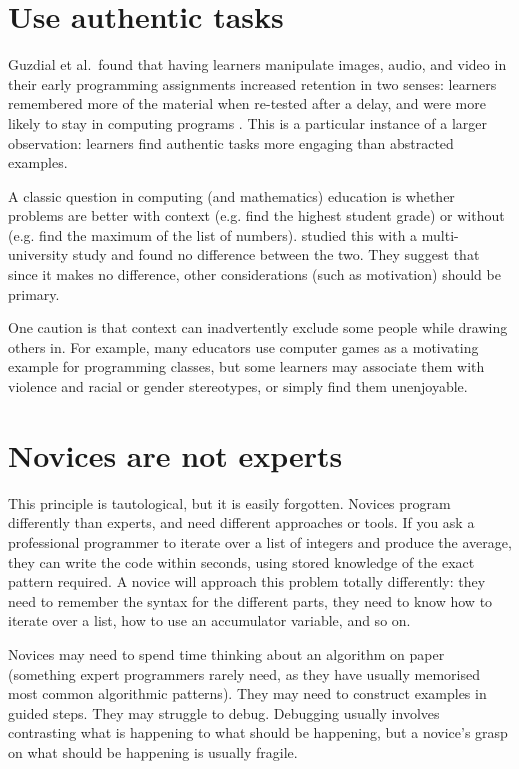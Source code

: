 \documentclass{article}
\begin{document}
\section{Use authentic tasks}\label{authentic-tasks}

Guzdial et al.\ found that having learners manipulate images, audio, and video
in their early programming assignments
increased retention in two senses:
learners remembered more of the material when re-tested after a delay,
and were more likely to stay in computing programs \citep{guzdial-media}.
This is a particular instance of a larger observation:
learners find authentic tasks more engaging than abstracted examples.

A classic question in computing (and mathematics) education is whether problems are better 
with context (e.g. find the highest student grade) or without (e.g. find the maximum of the list of numbers).
\citet{bouvier-context} studied this with a multi-university study and found no difference between
the two.  They suggest that since it makes no difference, other considerations (such as motivation)
should be primary.

One caution is that context can inadvertently exclude some people while drawing others in.
For example,
many educators use computer games as a motivating example for programming classes,
but some learners may associate them with violence and racial or gender stereotypes,
or simply find them unenjoyable.

\section{Novices are not experts}\label{not-experts}

This principle is tautological, but it is easily forgotten.
Novices program differently than experts,
and need different approaches or tools.
If you ask a professional programmer to iterate over a list of integers and produce the average,
they can write the code within seconds,
using stored knowledge of the exact pattern required.
A novice will approach this problem totally differently:
they need to remember the syntax for the different parts,
they need to know how to iterate over a list,
how to use an accumulator variable,
and so on.

Novices may need to spend time thinking about an algorithm on paper
(something expert programmers rarely need,
as they have usually memorised most common algorithmic patterns).
They may need to construct examples in guided steps.
They may struggle to debug.
Debugging usually involves contrasting what is happening to what should be happening,
but a novice's grasp on what should be happening is usually fragile.
\end{document}

